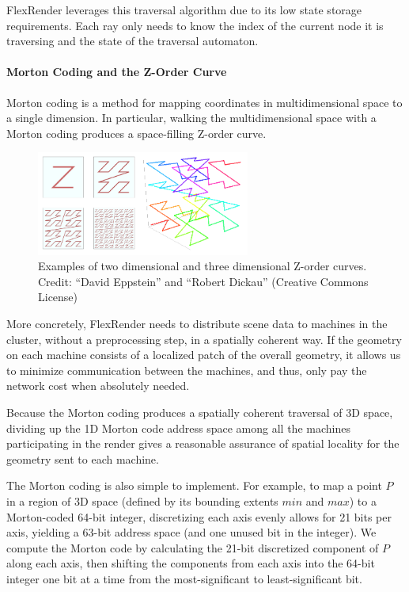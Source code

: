 \documentclass[a4paper,twoside]{article}
\begin{document}
FlexRender leverages this traversal algorithm due to its low state storage
requirements. Each ray only needs to know the index of the current node it is
traversing and the state of the traversal automaton.

\paragraph{Morton Coding and the Z-Order Curve}
Morton coding is a method for mapping coordinates in multidimensional space to
a single dimension. In particular, walking the multidimensional space with a
Morton coding produces a space-filling Z-order curve.

\begin{figure}[h!]
    \centering
    \includegraphics[width=70mm]{figures/zorder.png}
    \caption{Examples of two dimensional and three dimensional Z-order curves. Credit: ``David Eppstein'' and ``Robert Dickau'' (Creative Commons License)}
    \label{fig:zorder}
\end{figure}

More concretely, FlexRender needs to distribute scene data to machines in the
cluster, without a preprocessing step, in a spatially coherent way. If the
geometry on each machine consists of a localized patch of the overall geometry,
it allows us to minimize communication between the machines, and thus, only pay
the network cost when absolutely needed.

Because the Morton coding produces a spatially coherent traversal of 3D space,
dividing up the 1D Morton code address space among all the machines participating
in the render gives a reasonable assurance of spatial locality for the geometry
sent to each machine.

The Morton coding is also simple to implement. For example, to
map a point $P$ in a region of 3D space (defined by its bounding extents
$min$ and $max$) to a Morton-coded 64-bit integer, discretizing each axis evenly
allows for 21 bits per axis, yielding a 63-bit address space (and one unused bit
in the integer). We compute the Morton code by calculating the 21-bit
discretized component of $P$ along each axis, then shifting the components from
each axis into the 64-bit integer one bit at a time from the
most-significant to least-significant bit.
\end{document}
